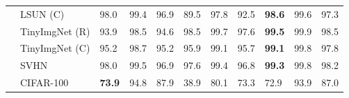 \documentclass{article}
\begin{document}
\begin{table}[htbp]
\begin{tabular}{cllll}
                                                                             & LSUN (C)                                  & 98.0                                                                          & 99.4                      & 96.9                       & 89.5                                                                          & 97.8                      & 92.5                       & \textbf{98.6}                                                                 & 99.6                      & 97.3                        \\
                                                                             & TinyImgNet (R)                            & 93.9                                                                          & 98.5                      & 94.6                       & 98.5                                                                          & 99.7                      & 97.6                       & \textbf{99.5}                                                                 & 99.9                      & 98.5                        \\
                                                                             & TinyImgNet (C)                            & 95.2                                                                          & 98.7                      & 95.2                       & 95.9                                                                          & 99.1                      & 95.7                       & \textbf{99.1}                                                                 & 99.8                      & 97.8                        \\
                                                                             & SVHN                                      & 98.0                                                                          & 99.5                      & 96.9                       & 97.6                                                                          & 99.4                      & 96.8                       & \textbf{99.3}                                                                 & 99.8                      & 98.2                        \\
                                                                             & CIFAR-100                                 & \textbf{73.9}                                                                 & 94.8                      & 87.9                       & 38.9                                                                          & 80.1                      & 73.3                       & 72.9                                                                          & 93.9                      & 87.0                        \\

\end{tabular}
\end{table}
\end{document}
